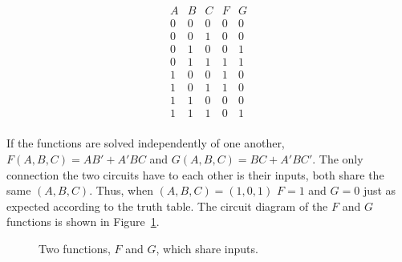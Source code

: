 $$\begin{array}{c|c|c||c|c}
A & B & C & F & G \\ \hline
0 & 0 & 0 & 0 & 0 \\ \hline
0 & 0 & 1 & 0 & 0 \\ \hline
0 & 1 & 0 & 0 & 1 \\ \hline
0 & 1 & 1 & 1 & 1 \\ \hline
1 & 0 & 0 & 1 & 0 \\ \hline
1 & 0 & 1 & 1 & 0 \\ \hline
1 & 1 & 0 & 0 & 0 \\ \hline
1 & 1 & 1 & 0 & 1 \\
\end{array}$$

\begin{changemargin}{1.5cm}{1.5cm}
If the functions are solved independently of one another,
$F(A,B,C)=AB'+A'BC$ and $G(A,B,C) = BC + A'BC'$.  The only
connection the two circuits have to each other is their inputs, both
share the same $(A,B,C)$.  Thus, when $(A,B,C) = (1,0,1)$ 
$F=1$ and $G=0$ just as expected according to
the truth table.  The circuit diagram of the $F$ and $G$ 
functions is shown in Figure~\ref{fig:minimizationMultiOut}.

\end{changemargin}

\begin{figure}[ht]
\caption{Two functions, $F$ and $G$, which share inputs.}
\label{fig:minimizationMultiOut}
\end{figure}

